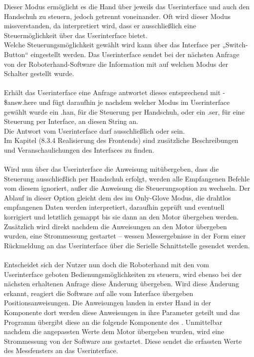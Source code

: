 \documentclass[titlepage,12pt,twoside]{article}
\begin{document}
Dieser Modus ermöglicht es die Hand über jeweils das Userinterface und auch den Handschuh zu steuern, jedoch getrennt voneinander. Oft wird dieser Modus 
missverstanden, da interpretiert wird, dass er ausschließlich eine Steuermöglichkeit über das Userinterface bietet. \\
Welche Steuerungsmöglichkeit gewählt wird kann über das Interface per „Switch-Button“ eingestellt werden. Das Userinterface sendet bei der nächsten 
Anfrage von der Roboterhand-Software die Information mit auf welchen Modus der Schalter gestellt wurde. \\
\\
Erhält das Userinterface eine Anfrage antwortet dieses entsprechend mit - \$answ.here und fügt daraufhin je nachdem welcher Modus im Userinterface gewählt 
wurde ein .han, für die Steuerung per Handschuh, oder ein .ser, für eine Steuerung per Interface, an diesen String an. \\
Die Antwort vom Userinterface darf ausschließlich  oder  sein. \\
Im Kapitel (8.3.4 Realisierung des Frontends) sind zusätzliche Beschreibungen und Veranschaulichungen des Interfaces zu finden. \\
\\
Wird nun über das Userinterface die Anweisung mitübergeben, dass die Steuerung ausschließlich per Handschuh erfolgt, werden alle Empfangenen Befehle vom 
diesem ignoriert, außer die Anweisung die Steuerungsoption zu wechseln. Der Ablauf in dieser Option gleicht dem des im Only-Glove Modus, die drahtlos 
empfangenen Daten werden interpretiert, daraufhin geprüft und eventuell korrigiert und letztlich gemappt bis sie dann an den Motor übergeben werden. 
Zusätzlich wird direkt nachdem die Anweisungen an den Motor übergeben wurden, eine Strommessung gestartet – wessen Messergebnisse in der Form einer 
Rückmeldung an das Userinterface über die Serielle Schnittstelle gesendet werden. \\
\\
Entscheidet sich der Nutzer nun doch die Roboterhand mit den vom Userinterface geboten Bedienungsmöglichkeiten zu steuern, wird ebenso bei der nächsten 
erhaltenen Anfrage diese Änderung übergeben. Wird diese Änderung erkannt, reagiert die Software auf alle vom Interface übergeben Positionsanweisungen. 
Die Anweisungen landen in erster Hand in der Komponente  dort werden diese Anweisungen in ihre Parameter geteilt und das Programm übergibt 
diese an die folgende Komponente des . Unmittelbar nachdem die angepassten Werte dem Motor übergeben wurden, wird eine Strommessung von 
der Software aus gestartet. Diese sendet die erfassten Werte des Messfensters an das Userinterface. \\
\\
\end{document}
